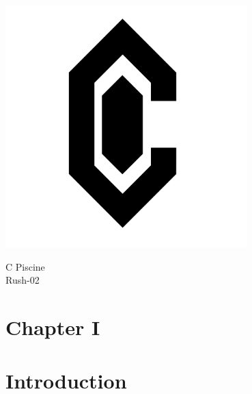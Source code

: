 \documentclass[12pt]{article}
\begin{document}
\begin{center}
  \includegraphics[width=0.7\textwidth]{logo-back.png}
  
  \vspace{1cm}
  
  \begin{center}
    \Huge C Piscine \\
    \LARGE Rush-02 \\
  \end{center}
\end{center}

\newpage
\tableofcontents
\newpage

\section*{\LARGE Chapter I}
\section*{\LARGE Introduction}
\end{document}
